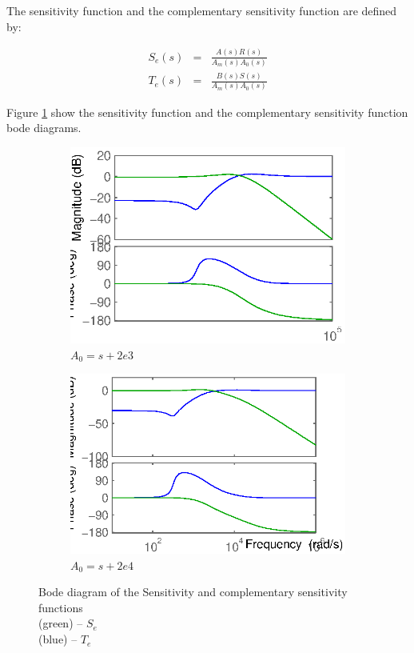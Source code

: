 The sensitivity function and the complementary sensitivity function are defined by:

$$\begin{array}{rcl}
   S_e(s) & = & \frac{A(s)R(s)}{A_m(s)A_0(s)} \\
   T_e(s) & = & \frac{B(s)S(s)}{A_m(s)A_0(s)}
  \end{array}$$

Figure \ref{sensitivity} show the sensitivity function and the complementary sensitivity function bode diagrams.

\begin{figure}[hb]
  \centering
  \begin{subfigure}[b]{\linewidth}
   \includegraphics[width=\columnwidth]{fig/bode_SeTe_designAm.eps}
   \caption{$A_0 = s+2e3$}
  \end{subfigure}
  \begin{subfigure}[b]{\linewidth}
  \includegraphics[width=\columnwidth]{fig/bode_SeTe_desginA0.eps}
   \caption{$A_0 = s + 2e4$}
  \end{subfigure}
 \caption{Bode diagram of the Sensitivity and complementary sensitivity functions \\ (green) -- $S_e$ \\ (blue) -- $T_e$ }
 \label{sensitivity}
\end{figure}

